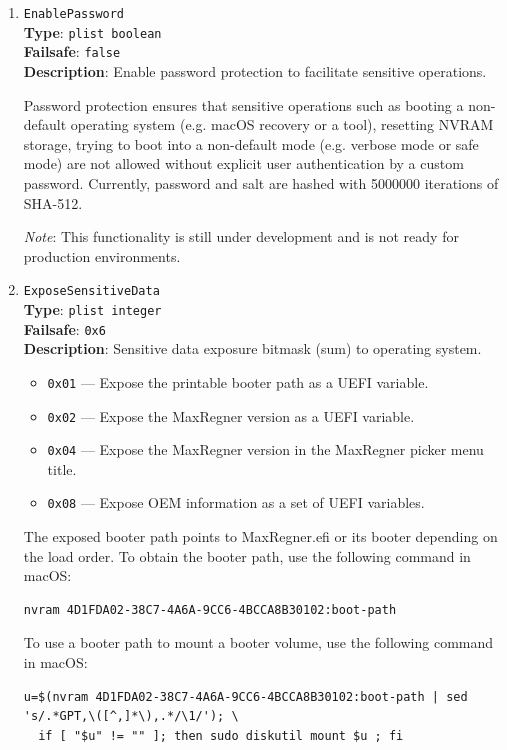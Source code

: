 \documentclass[]{article}
\providecommand{\tightlist}{%
  \setlength{\itemsep}{0pt}\setlength{\parskip}{0pt}}
\begin{document}
\begin{enumerate}
\item
  \texttt{EnablePassword}\\
  \textbf{Type}: \texttt{plist\ boolean}\\
  \textbf{Failsafe}: \texttt{false}\\
  \textbf{Description}: Enable password protection to facilitate sensitive operations.

  Password protection ensures that sensitive operations such as booting a non-default
  operating system (e.g. macOS recovery or a tool), resetting NVRAM storage,
  trying to boot into a non-default mode (e.g. verbose mode or safe mode) are not
  allowed without explicit user authentication by a custom password. Currently,
  password and salt are hashed with 5000000 iterations of SHA-512.

  \emph{Note}: This functionality is still under development and is not ready for
  production environments.

\item
  \texttt{ExposeSensitiveData}\\
  \textbf{Type}: \texttt{plist\ integer}\\
  \textbf{Failsafe}: \texttt{0x6}\\
  \textbf{Description}: Sensitive data exposure bitmask (sum) to operating system.

  \begin{itemize}
  \tightlist
    \item \texttt{0x01} --- Expose the printable booter path as a UEFI variable.
    \item \texttt{0x02} --- Expose the MaxRegner version as a UEFI variable.
    \item \texttt{0x04} --- Expose the MaxRegner version in the MaxRegner picker menu title.
    \item \texttt{0x08} --- Expose OEM information as a set of UEFI variables.
  \end{itemize}

  The exposed booter path points to MaxRegner.efi or its booter depending on the load order.
  To obtain the booter path, use the following command in macOS:
\begin{lstlisting}[label=nvrampath, style=ocbash]
nvram 4D1FDA02-38C7-4A6A-9CC6-4BCCA8B30102:boot-path
\end{lstlisting}

  To use a booter path to mount a booter volume, use the following command in macOS:
\begin{lstlisting}[label=nvrampathmount, style=ocbash]
u=$(nvram 4D1FDA02-38C7-4A6A-9CC6-4BCCA8B30102:boot-path | sed 's/.*GPT,\([^,]*\),.*/\1/'); \
  if [ "$u" != "" ]; then sudo diskutil mount $u ; fi
\end{lstlisting}


\end{enumerate}
\end{document}
